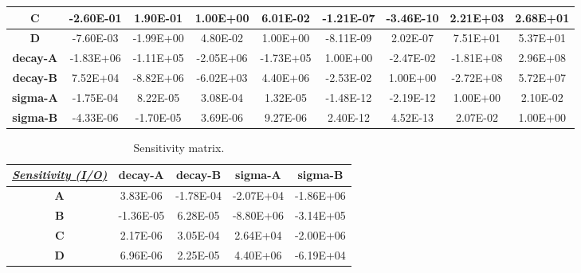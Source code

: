 \begin{landscape}
\begin{table}[h!]
\begin{tabular}{|c|c|c|c|c|c|c|c|c|}
\textbf{C}                                   & -2.60E-01  & 1.90E-01   & 1.00E+00   & 6.01E-02   & -1.21E-07        & -3.46E-10        & 2.21E+03         & 2.68E+01         \\ \hline
\textbf{D}                                   & -7.60E-03  & -1.99E+00  & 4.80E-02   & 1.00E+00   & -8.11E-09        & 2.02E-07         & 7.51E+01         & 5.37E+01         \\ \hline
\textbf{decay-A}                             & -1.83E+06  & -1.11E+05  & -2.05E+06  & -1.73E+05  & 1.00E+00         & -2.47E-02        & -1.81E+08        & 2.96E+08         \\ \hline
\textbf{decay-B}                             & 7.52E+04   & -8.82E+06  & -6.02E+03  & 4.40E+06   & -2.53E-02        & 1.00E+00         & -2.72E+08        & 5.72E+07         \\ \hline
\textbf{sigma-A}                             & -1.75E-04  & 8.22E-05   & 3.08E-04   & 1.32E-05   & -1.48E-12        & -2.19E-12        & 1.00E+00         & 2.10E-02         \\ \hline
\textbf{sigma-B}                             & -4.33E-06  & -1.70E-05  & 3.69E-06   & 9.27E-06   & 2.40E-12         & 4.52E-13         & 2.07E-02         & 1.00E+00         \\ \hline
\end{tabular}
\end{table}
\begin{table}[h!]
\centering
\caption{Sensitivity matrix.}
\label{SensitivityComputed}
\begin{tabular}{|c|c|c|c|c|}
\hline
{\ul \textit{\textbf{Sensitivity (I/O)}}} & \textbf{decay-A} & \textbf{decay-B} & \textbf{sigma-A} & \textbf{sigma-B} \\ \hline
\textbf{A}                                & 3.83E-06         & -1.78E-04        & -2.07E+04        & -1.86E+06        \\ \hline
\textbf{B}                                & -1.36E-05        & 6.28E-05         & -8.80E+06        & -3.14E+05        \\ \hline
\textbf{C}                                & 2.17E-06         & 3.05E-04         & 2.64E+04         & -2.00E+06        \\ \hline
\textbf{D}                                & 6.96E-06         & 2.25E-05         & 4.40E+06         & -6.19E+04        \\ \hline
\end{tabular}
\end{table}
\end{landscape}

